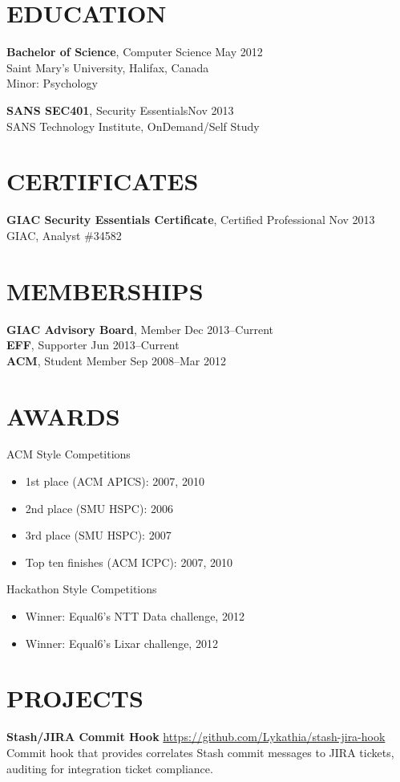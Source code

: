 \documentclass[line,margin]{res}
\begin{document}
\begin{resume}
\section{EDUCATION}
\textbf{Bachelor of Science}, Computer Science \hfill May 2012 \\
Saint Mary's University, Halifax, Canada \\
Minor: Psychology

\textbf{SANS SEC401}, Security Essentials\hfill Nov 2013 \\
SANS Technology Institute, OnDemand/Self Study

\section{CERTIFICATES}
\textbf{GIAC Security Essentials Certificate}, Certified Professional \hfill Nov 2013 \\
GIAC, Analyst \#34582

\section{MEMBERSHIPS}
\textbf{GIAC Advisory Board}, Member \hfill Dec 2013--Current \\
\textbf{EFF}, Supporter \hfill Jun 2013--Current \\
\textbf{ACM}, Student Member \hfill Sep 2008--Mar 2012

\section{AWARDS}
ACM Style Competitions
\begin{itemize} \itemsep-2pt
    \item 1st place (ACM APICS): 2007, 2010
    \item 2nd place (SMU HSPC): 2006
    \item 3rd place (SMU HSPC): 2007
    \item Top ten finishes (ACM ICPC): 2007, 2010
\end{itemize}

Hackathon Style Competitions
\begin{itemize} \itemsep-2pt
    \item Winner: Equal6's NTT Data challenge, 2012
    \item Winner: Equal6's Lixar challenge, 2012
\end{itemize}

\section{PROJECTS}
\textbf{Stash/JIRA Commit Hook} \hfill \url{https://github.com/Lykathia/stash-jira-hook} \\
Commit hook that provides correlates Stash commit messages to JIRA tickets, auditing for integration ticket compliance.


\end{resume}
\end{document}
